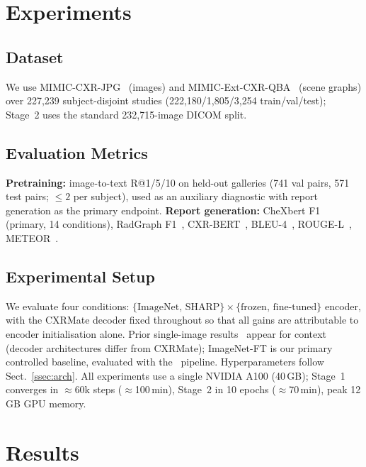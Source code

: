 \documentclass[runningheads]{llncs}
\begin{document}
\section{Experiments}
\label{sec:experiments}

\subsection{Dataset}

We use MIMIC-CXR-JPG~\cite{mimiccxr} (images) and
MIMIC-Ext-CXR-QBA~\cite{mimicextcxrqba} (scene graphs) over
227,239 subject-disjoint studies (222,180/1,805/3,254 train/val/test);
Stage~2 uses the standard 232,715-image DICOM split.

\subsection{Evaluation Metrics}

\textbf{Pretraining:} image-to-text R@1/5/10 on held-out galleries
(741 val pairs, 571 test pairs; ${\leq}2$ per subject), used as an
auxiliary diagnostic with report generation as the primary endpoint.
\textbf{Report generation:} CheXbert F1~\cite{chexbert} (primary, 14
conditions), RadGraph F1~\cite{radgraph}, CXR-BERT~\cite{cxrbert},
BLEU-4~\cite{bleu}, ROUGE-L~\cite{rouge}, METEOR~\cite{meteor}.

\subsection{Experimental Setup}

We evaluate four conditions:
$\{\text{ImageNet},\,\text{SHARP}\}\!\times\!\{\text{frozen},\,\text{fine-tuned}\}$
encoder, with the CXRMate decoder fixed throughout so that all gains
are attributable to encoder initialisation alone.
Prior single-image results~\cite{r2gen,cmn,cvt2gpt2} appear for context
(decoder architectures differ from CXRMate); ImageNet-FT is our primary
controlled baseline, evaluated with the~\cite{cxrmate} pipeline.
Hyperparameters follow Sect.~\ref{ssec:arch}.
All experiments use a single NVIDIA A100 (40\,GB); Stage~1 converges
in ${\approx}$60k steps (${\approx}$100\,min), Stage~2 in 10 epochs
(${\approx}$70\,min), peak 12\,GB GPU memory.

\section{Results}
\label{sec:results}
\end{document}
